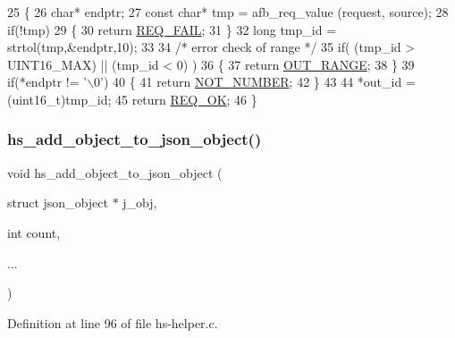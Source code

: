 \begin{DoxyCode}
25 \{
26     \textcolor{keywordtype}{char}* endptr;
27     \textcolor{keyword}{const} \textcolor{keywordtype}{char}* tmp = afb\_req\_value (request, source);
28     \textcolor{keywordflow}{if}(!tmp)
29     \{
30         \textcolor{keywordflow}{return} \hyperlink{hs-helper_8h_aa49f1dbbf26f01627a5737cf43aad899a96a855966bc63045222b3dcac524cee1}{REQ\_FAIL};
31     \}
32     \textcolor{keywordtype}{long} tmp\_id = strtol(tmp,&endptr,10);
33 
34     \textcolor{comment}{/* error check of range */}
35     \textcolor{keywordflow}{if}( (tmp\_id > UINT16\_MAX) || (tmp\_id < 0) )
36     \{
37         \textcolor{keywordflow}{return} \hyperlink{hs-helper_8h_aa49f1dbbf26f01627a5737cf43aad899add1c84bf80c5f80741ee8f37fef1e12b}{OUT\_RANGE};
38     \}
39     \textcolor{keywordflow}{if}(*endptr != \textcolor{charliteral}{'\(\backslash\)0'})
40     \{
41         \textcolor{keywordflow}{return} \hyperlink{hs-helper_8h_aa49f1dbbf26f01627a5737cf43aad899aa223eed65c9bee2bf1f4cdecaf90d66a}{NOT\_NUMBER};
42     \}
43 
44     *out\_id = (uint16\_t)tmp\_id;
45     \textcolor{keywordflow}{return} \hyperlink{hs-helper_8h_aa49f1dbbf26f01627a5737cf43aad899ab093abb14c097b3b7719debb04d5e8ee}{REQ\_OK};
46 \}
\end{DoxyCode}
\mbox{\label{hs-helper_8h_a1ba31a6a94515ff1730ba0043a67d59e}} 
\subsubsection{\texorpdfstring{hs\+\_\+add\+\_\+object\+\_\+to\+\_\+json\+\_\+object()}{hs\_add\_object\_to\_json\_object()}}
{\footnotesize\ttfamily void hs\+\_\+add\+\_\+object\+\_\+to\+\_\+json\+\_\+object (\begin{DoxyParamCaption}\item[{struct json\+\_\+object $\ast$}]{j\+\_\+obj,  }\item[{int}]{count,  }\item[{}]{... }\end{DoxyParamCaption})}



Definition at line 96 of file hs-\/helper.\+c.


